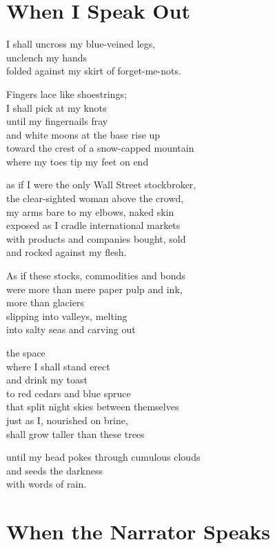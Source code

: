 \documentclass[twoside,10pt]{book}
\begin{document}
\clearpage
\section{When I Speak Out}

I shall uncross my blue-veined legs,\\
unclench my hands\\
folded against my skirt of forget-me-nots.

Fingers lace like shoestrings;\\
I shall pick at my knots\\
until my fingernails fray\\
and white moons at the base rise up\\
toward the crest of a snow-capped mountain\\
where my toes tip my feet on end

as if I were the only Wall Street stockbroker,\\
the clear-sighted woman above the crowd,\\
my arms bare to my elbows, naked skin\\
exposed as I cradle international markets\\
with products and companies bought, sold\\
and rocked against my flesh.

As if these stocks, commodities and bonds\\
were more than mere paper pulp and ink,\\
more than glaciers\\
slipping into valleys, melting\\
into salty seas and carving out

the space\\
where I shall stand erect\\
and drink my toast\\
to red cedars and blue spruce\\
that split night skies between themselves\\
just as I, nourished on brine,\\
shall grow taller than these trees

until my head pokes through cumulous clouds\\
and seeds the darkness\\
with words of rain.


\clearpage
\section{When the Narrator Speaks}
\end{document}
